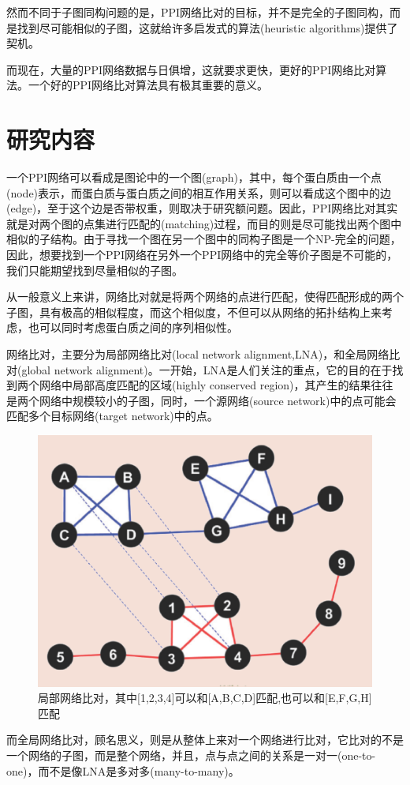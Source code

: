 然而不同于子图同构问题的是，PPI网络比对的目标，并不是完全的子图同构，而是找到尽可能相似的子图，这就给许多启发式的算法(heuristic algorithms)提供了契机。

而现在，大量的PPI网络数据与日俱增\cite{breitkreutz2008biogrid,hulovatyy2014revealing}，这就要求更快，更好的PPI网络比对算法。一个好的PPI网络比对算法具有极其重要的意义。

\section{研究内容}
一个PPI网络可以看成是图论中的一个图(graph)，其中，每个蛋白质由一个点(node)表示，而蛋白质与蛋白质之间的相互作用关系，则可以看成这个图中的边(edge)，至于这个边是否带权重，则取决于研究额问题。因此，PPI网络比对其实就是对两个图的点集进行匹配的(matching)过程，而目的则是尽可能找出两个图中相似的子结构。由于寻找一个图在另一个图中的同构子图是一个NP-完全的问题\cite{cook1971complexity}，因此，想要找到一个PPI网络在另外一个PPI网络中的完全等价子图是不可能的，我们只能期望找到尽量相似的子图。

从一般意义上来讲，网络比对就是将两个网络的点进行匹配，使得匹配形成的两个子图，具有极高的相似程度，而这个相似度，不但可以从网络的拓扑结构上来考虑，也可以同时考虑蛋白质之间的序列相似性。

网络比对，主要分为局部网络比对(local network alignment,LNA)，和全局网络比对(global network alignment)。一开始，LNA是人们关注的重点，它的目的在于找到两个网络中局部高度匹配的区域(highly conserved region)，其产生的结果往往是两个网络中规模较小的子图，同时，一个源网络(source network)中的点可能会匹配多个目标网络(target network)中的点。

\begin{figure}[htbp]
\centering
\includegraphics[height=0.25\textheight]{pic/lna.png}
\captionsetup{margin=50pt}
\caption{局部网络比对，其中[1,2,3,4]可以和[A,B,C,D]匹配,也可以和[E,F,G,H]匹配 \cite{atias2012comparative} \label{fig:lna}}
\end{figure}
而全局网络比对，顾名思义，则是从整体上来对一个网络进行比对，它比对的不是一个网络的子图，而是整个网络，并且，点与点之间的关系是一对一(one-to-one)，而不是像LNA是多对多(many-to-many)。

